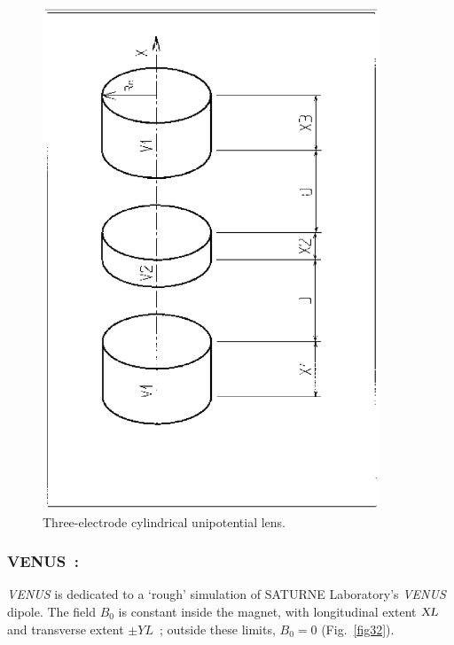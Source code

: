 {%
\begin{figure}[H]
\centerline{\includegraphics[height=15cm,angle=-90]{Fig31.ps}}
\caption{\label{fig31}Three-electrode cylindrical unipotential lens.}
\end{figure}
\vfill

\newpage

\subsubsection*{VENUS~: \VENUSTitl}  \label{VENUS}
\medskip 
{} 

\textsl{VENUS} is dedicated to a `rough' simulation
of SATURNE Laboratory's  \textsl{VENUS} 
dipole.  The field $ B_0 $ is constant inside the magnet, with longitudinal 
extent $ \textsl{XL} $ and transverse extent $ \pm YL $~;  outside these limits, $ B_0=0$ 
(Fig.~\ref{fig32}).  

}
